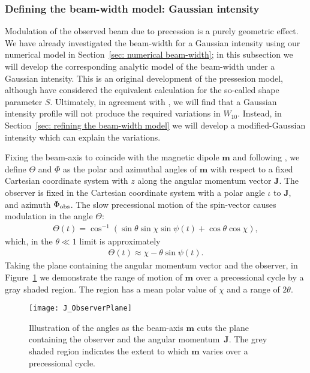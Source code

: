 \documentclass[../full_thesis/full_thesis.tex]{subfiles}
\begin{document}
\subsubsection{Defining the beam-width model: Gaussian intensity}

Modulation of the observed beam due to precession is a purely geometric effect.
We have already investigated the beam-width for a Gaussian intensity using our
numerical model in Section~\ref{sec: numerical beam-width}; in this subsection
we will develop the corresponding analytic model of the beam-width under a
Gaussian intensity. This is an original development of the pressesion model,
although \citet{Akgun2006} have considered the equivalent calculation for the
so-called shape parameter $S$. Ultimately, in agreement with \citet{Akgun2006},
we will find that a Gaussian intensity profile will not produce the required
variations in $W_{10}$. Instead, in Section~\ref{sec: refining the beam-width
model} we will develop a modified-Gaussian intensity which can explain the
variations.

Fixing the beam-axis to coincide with the magnetic dipole $\mathbf{m}$ and
following \citet{Jones2001}, we define $\Theta$ and $\Phi$ as the polar and
azimuthal angles of $\mathbf{m}$ with respect to a fixed Cartesian coordinate
system with $z$ along the angular momentum vector $\textbf{J}$. The observer is
fixed in the Cartesian coordinate system with a polar angle $\iota$ to $\textbf{J}$, and
azimuth $\Phi_{\mathrm{obs}}$. The slow precessional motion of the spin-vector causes modulation
in the angle $\Theta$:
\begin{align}
\Theta(t) = \cos^{-1}\left(\sin\theta\sin\chi\sin\psi(t) + \cos\theta\cos\chi\right),
\label{eqn: Theta}
\end{align}
which, in the $\theta \ll 1$ limit is approximately
\begin{align}
\Theta(t) \approx \chi - \theta \sin\psi(t).
\end{align}
Taking the plane containing the angular momentum vector and the observer, in
Figure~\ref{fig: J observer plane} we demonstrate the range of motion of
$\mathbf{m}$ over a precessional cycle by a gray shaded region.  The region has
a mean polar value of $\chi$ and a range of $2\theta$.
\begin{figure}
\centering \texttt{[image: J\_ObserverPlane]}
\caption{Illustration of the angles as the beam-axis $\mathbf{m}$ cuts the
         plane containing the observer and the angular momentum~$\mathbf{J}$.
         The grey shaded region indicates the extent to which $\mathbf{m}$
         varies over a precessional cycle.}
\label{fig: J observer plane}
\end{figure}
\end{document}
